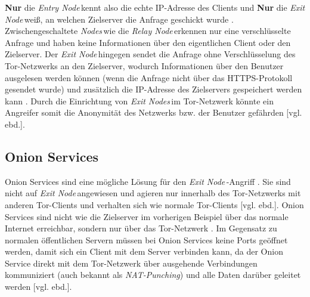 \documentclass[a4paper,ngerman, headheight=28pt,12pt]{scrartcl}
\newcommand{\vcite}[1]{\cite[vgl.][]{#1}}
\newcommand{\vebd}{[vgl. ebd.]}
\newcommand{\entryn}{\textit{Entry Node\,}}
\newcommand{\relayn}{\textit{Relay Node\,}}
\newcommand{\exitn}{\textit{Exit Node\,}}
\newcommand{\exitns}{\textit{Exit Nodes\,}}
\newcommand{\nodes}{\textit{Nodes\,}}
\begin{document}
\textbf{Nur} die \entryn kennt also die echte IP-Adresse des Clients und \textbf{Nur} die \exitn weiß, an welchen Zielserver die Anfrage geschickt wurde \vcite{TorStructure2}. Zwischengeschaltete \nodes wie die \relayn erkennen nur eine verschlüsselte Anfrage und haben keine Informationen über den eigentlichen Client oder den Zielserver. Der \exitn hingegen sendet die Anfrage ohne Verschlüsselung des Tor-Netzwerks an den Zielserver, wodurch Informationen über den Benutzer ausgelesen werden können (wenn die Anfrage nicht über das HTTPS-Protokoll gesendet wurde) und zusätzlich die IP-Adresse des Zielservers gespeichert werden kann \vcite{TorExitNodeVulnerability}. Durch die Einrichtung von \exitns im Tor-Netzwerk könnte ein Angreifer somit die Anonymität des Netzwerks bzw. der Benutzer gefährden \vebd.

\subsection{Onion Services}
Onion Services sind eine mögliche Lösung für den \exitn-Angriff \vcite{TorOnionServiceTalk}. Sie sind nicht auf \exitn angewiesen und agieren nur innerhalb des Tor-Netzwerks mit anderen Tor-Clients und verhalten sich wie normale Tor-Clients \vebd. Onion Services sind nicht wie die Zielserver im vorherigen Beispiel über das normale Internet erreichbar, sondern nur über das Tor-Netzwerk \vcite{TorOnionService}. Im Gegensatz zu normalen öffentlichen Servern müssen bei Onion Services keine Ports geöffnet werden, damit sich ein Client mit dem Server verbinden kann, da der Onion Service direkt mit dem Tor-Netzwerk über ausgehende Verbindungen kommuniziert (auch bekannt als \textit{NAT-Punching}) und alle Daten darüber geleitet werden \vebd.
\end{document}

